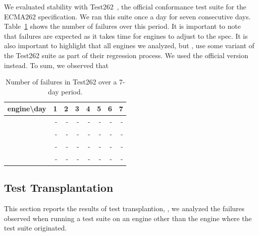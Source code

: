 \documentclass[10pt,conference,anonymous]{IEEEtran}
\begin{document}
We evaluated stability with Test262~\cite{ecma262-conformance-suite},
the official \js{} conformance test suite for the ECMA262
specification. We ran this suite once a day for seven consecutive
days. Table~\ref{tab:test262} shows the number of failures over this
period. It is important to note that failures are expected as it takes
time for engines to adjust to the spec. It is also important to
highlight that all engines we analyzed, but \chakra{}, use some
variant of the Test262 suite as part of their regression
process. We used the official version
instead. To sum, we observed
that  

\begin{table}[h]
  \centering
  \caption{\label{tab:test262}Number of failures in Test262 over
    a 7-day period.}
  \begin{tabular}{crrrrrrr}
    \toprule
    engine\textbackslash{}day& 1 & 2 & 3 & 4 & 5 & 6 & 7 \\
    \midrule
    \jsc{} & - & - & - & - & - & - & - \\
    \veight{} & - & - & - & - & - & - & - \\
    \chakra{} & - & - & - & - & - & - & - \\
    \smonkey{} & - & - & - & - & - & - & - \\
    \bottomrule 
  \end{tabular}
\end{table}



\subsection{Test Transplantation}
\label{sec:transplantation}

This section reports the results of test transplantion, \ie{}, we
analyzed the failures observed when running a test suite on an engine
other than the engine where the test suite
originated.
\end{document}

